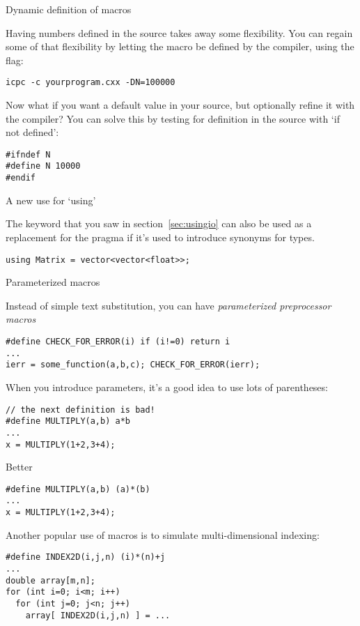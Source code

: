  {Dynamic definition of macros}

Having numbers defined in the source takes away some flexibility.
You can regain some of that flexibility by letting the macro
be defined by the compiler, using the  flag:
\begin{verbatim}
icpc -c yourprogram.cxx -DN=100000
\end{verbatim}

Now what if you want a default value in your source,
but optionally refine it with the compiler?
You can solve this by testing for definition
in the source with  `if not defined':
\begin{lstlisting}
#ifndef N
#define N 10000
#endif
\end{lstlisting}

 {A new use for `using'}

The  keyword that you saw in section~\ref{sec:usingio}
can also be used as a replacement for the  pragma
if it's used to introduce synonyms for types.
\begin{lstlisting}
using Matrix = vector<vector<float>>;
\end{lstlisting}

 {Parameterized macros}
\label{sec:cpp-define-fun}

Instead of simple text substitution, you can have
%
\emph{parameterized preprocessor macros}
\begin{lstlisting}
#define CHECK_FOR_ERROR(i) if (i!=0) return i
...
ierr = some_function(a,b,c); CHECK_FOR_ERROR(ierr);
\end{lstlisting}

When you introduce parameters, it's a good idea to use lots of parentheses:
\begin{lstlisting}
// the next definition is bad!
#define MULTIPLY(a,b) a*b
...
x = MULTIPLY(1+2,3+4);
\end{lstlisting}
Better
\begin{lstlisting}
#define MULTIPLY(a,b) (a)*(b)
...
x = MULTIPLY(1+2,3+4);
\end{lstlisting}

Another popular use of macros is to simulate multi-dimensional indexing:
\begin{lstlisting}
#define INDEX2D(i,j,n) (i)*(n)+j
...
double array[m,n];
for (int i=0; i<m; i++)
  for (int j=0; j<n; j++)
    array[ INDEX2D(i,j,n) ] = ...
\end{lstlisting}

